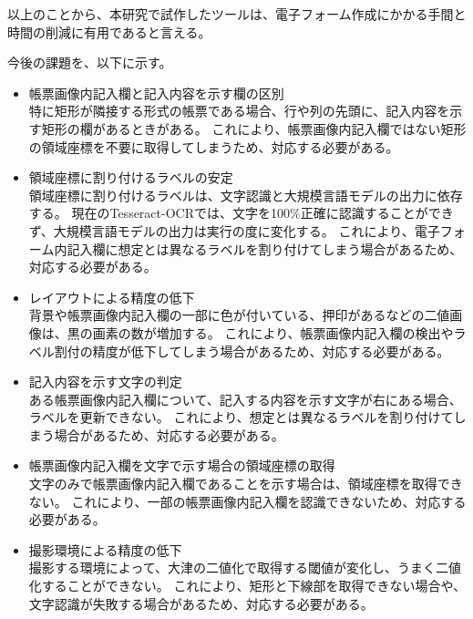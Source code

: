 以上のことから、本研究で試作したツールは、電子フォーム作成にかかる手間と時間の削減に有用であると言える。

今後の課題を、以下に示す。

\begin{itemize}
    \item 帳票画像内記入欄と記入内容を示す欄の区別\\
        特に矩形が隣接する形式の帳票である場合、行や列の先頭に、記入内容を示す矩形の欄があるときがある。
        これにより、帳票画像内記入欄ではない矩形の領域座標を不要に取得してしまうため、対応する必要がある。
    \item 領域座標に割り付けるラベルの安定\\
        領域座標に割り付けるラベルは、文字認識と大規模言語モデルの出力に依存する。
        現在のTesseract-OCRでは、文字を100\%正確に認識することができず、大規模言語モデルの出力は実行の度に変化する。
        これにより、電子フォーム内記入欄に想定とは異なるラベルを割り付けてしまう場合があるため、対応する必要がある。
    \item レイアウトによる精度の低下\\
        背景や帳票画像内記入欄の一部に色が付いている、押印があるなどの二値画像は、黒の画素の数が増加する。
        これにより、帳票画像内記入欄の検出やラベル割付の精度が低下してしまう場合があるため、対応する必要がある。
    \item 記入内容を示す文字の判定\\
        ある帳票画像内記入欄について、記入する内容を示す文字が右にある場合、ラベルを更新できない。
        これにより、想定とは異なるラベルを割り付けてしまう場合があるため、対応する必要がある。
    \item 帳票画像内記入欄を文字で示す場合の領域座標の取得\\
        文字のみで帳票画像内記入欄であることを示す場合は、領域座標を取得できない。
        これにより、一部の帳票画像内記入欄を認識できないため、対応する必要がある。
    \item 撮影環境による精度の低下\\
        撮影する環境によって、大津の二値化で取得する閾値が変化し、うまく二値化することができない。
        これにより、矩形と下線部を取得できない場合や、文字認識が失敗する場合があるため、対応する必要がある。
\end{itemize}